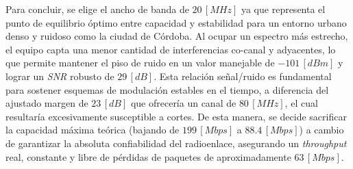 Para concluir, se elige el ancho de banda de $20 \, [MHz]$ ya que representa el punto de equilibrio óptimo entre capacidad y estabilidad para un entorno urbano denso y ruidoso como la ciudad de Córdoba. Al ocupar un espectro más estrecho, el equipo capta una menor cantidad de interferencias co-canal y adyacentes, lo que permite mantener el piso de ruido en un valor manejable de $-101 \, [dBm]$ y lograr un \textit{SNR} robusto de $29 \, [dB]$. Esta relación señal/ruido es fundamental para sostener esquemas de modulación estables en el tiempo, a diferencia del ajustado margen de $23 \, [dB]$ que ofrecería un canal de $80 \, [MHz]$, el cual resultaría excesivamente susceptible a cortes. De esta manera, se decide sacrificar la capacidad máxima teórica (bajando de $199 \, [Mbps]$ a $88.4 \, [Mbps]$) a cambio de garantizar la absoluta confiabilidad del radioenlace, asegurando un \textit{throughput} real, constante y libre de pérdidas de paquetes de aproximadamente $63 \, [Mbps]$.



